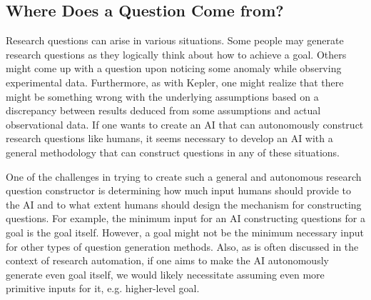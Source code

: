 

 

\subsection{Where Does a Question Come from?}
Research questions can arise in various situations. Some people may generate research questions as they logically think about how to achieve a goal. Others might come up with a question upon noticing some anomaly while observing experimental data. Furthermore, as with Kepler, one might realize that there might be something wrong with the underlying assumptions based on a discrepancy between results deduced from some assumptions and actual observational data. If one wants to create an AI that can autonomously construct research questions like humans, it seems necessary to develop an AI with a general methodology that can construct questions in any of these situations.

One of the challenges in trying to create such a general and autonomous research question constructor is determining how much input humans should provide to the AI and to what extent humans should design the mechanism for constructing questions. For example, the minimum input for an AI constructing questions for a goal is the goal itself. However, a goal might not be the minimum necessary input for other types of question generation methods. Also, as is often discussed in the context of research automation, if one aims to make the AI autonomously generate even goal itself, we would likely necessitate assuming even more primitive inputs for it, e.g. higher-level goal.


